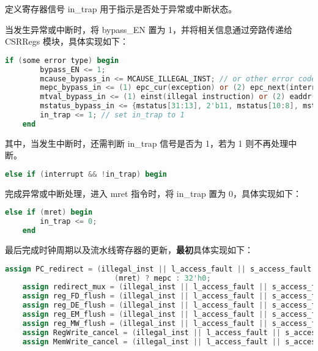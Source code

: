 \documentclass{article}
\begin{document}
定义寄存器信号 in\_trap 用于指示是否处于异常或中断状态。\par
当发生异常或中断时，将 bypass\_EN 置为 1，并将相关信息通过旁路传递给 CSRRegs 模块，具体实现如下：\par
\begin{lstlisting}[language=Verilog]
    if (some error type) begin
        bypass_EN <= 1;
        mcause_bypass_in <= MCAUSE_ILLEGAL_INST; // or other error code, according to the error type
        mepc_bypass_in <= (1) epc_cur(exception) or (2) epc_next(interrupt);
        mtval_bypass_in <= (1) einst(illegal instruction) or (2) eaddr(load/store address misaligned) or (3) 32'h0(others);
        mstatus_bypass_in <= {mstatus[31:13], 2'b11, mstatus[10:8], mstatus[3], mstatus[6:4], 1'b0, mstatus[2:0]}; // set MPP to 11, MPIE(mstatus[7]) to MIE(mstatus[3]), MIE(mstatus[3]) to 0
        in_trap <= 1; // set in_trap to 1
    end
\end{lstlisting}
其中，当发生中断时，还需判断 in\_trap 信号是否为 1，若为 1 则不再处理中断。\par
\begin{lstlisting}[language=Verilog]
    else if (interrupt && !in_trap) begin
\end{lstlisting}

完成异常或中断处理，进入 mret 指令时，将 in\_trap 置为 0，具体实现如下：\par
\begin{lstlisting}[language=Verilog]
    else if (mret) begin
        in_trap <= 0;
    end
\end{lstlisting}

最后完成时钟周期以及流水线寄存器的更新，\textbf{最初}具体实现如下：\par
\begin{lstlisting}[language=Verilog]
    assign PC_redirect = (illegal_inst || l_access_fault || s_access_fault || ecall_m || interrupt && !in_trap) ? mtvec :
                         (mret) ? mepc : 32'h0;
    assign redirect_mux = (illegal_inst || l_access_fault || s_access_fault || ecall_m || (interrupt && !in_trap) || mret) ? 1'b1 : 1'b0;
    assign reg_FD_flush = (illegal_inst || l_access_fault || s_access_fault || ecall_m || (interrupt && !in_trap) || mret) ? 1'b1 : 1'b0;
    assign reg_DE_flush = (illegal_inst || l_access_fault || s_access_fault || ecall_m || (interrupt && !in_trap) || mret) ? 1'b1 : 1'b0;
    assign reg_EM_flush = (illegal_inst || l_access_fault || s_access_fault || ecall_m || (interrupt && !in_trap) || mret) ? 1'b1 : 1'b0;
    assign reg_MW_flush = (illegal_inst || l_access_fault || s_access_fault || ecall_m || (interrupt && !in_trap) || mret) ? 1'b1 : 1'b0;
    assign RegWrite_cancel = (illegal_inst || l_access_fault || s_access_fault || ecall_m || (interrupt && !in_trap) || mret) ? 1'b1 : 1'b0;
    assign MemWrite_cancel = (illegal_inst || l_access_fault || s_access_fault || ecall_m || (interrupt && !in_trap) || mret) ? 1'b1 : 1'b0;
\end{lstlisting}
\end{document}
